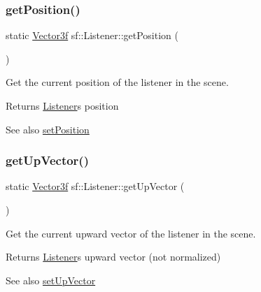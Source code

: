 \subsubsection{\texorpdfstring{getPosition()}{getPosition()}}
{\footnotesize\ttfamily static \mbox{\hyperlink{classsf_1_1_vector3}{Vector3f}} sf\+::\+Listener\+::get\+Position (\begin{DoxyParamCaption}{ }\end{DoxyParamCaption})\hspace{0.3cm}{\ttfamily [static]}}



Get the current position of the listener in the scene. 

\begin{DoxyReturn}{Returns}
\mbox{\hyperlink{classsf_1_1_listener}{Listener}}\textquotesingle{}s position
\end{DoxyReturn}
\begin{DoxySeeAlso}{See also}
\mbox{\hyperlink{classsf_1_1_listener_a5bc2d8d18ea2d8f339d23cbf17678564}{set\+Position}} \begin{DoxyVerb}\end{DoxyVerb}
 
\end{DoxySeeAlso}
\mbox{\label{classsf_1_1_listener_ae1427dd7e9b425b0c23b7b766bd6c6e6}} 
\subsubsection{\texorpdfstring{getUpVector()}{getUpVector()}}
{\footnotesize\ttfamily static \mbox{\hyperlink{classsf_1_1_vector3}{Vector3f}} sf\+::\+Listener\+::get\+Up\+Vector (\begin{DoxyParamCaption}{ }\end{DoxyParamCaption})\hspace{0.3cm}{\ttfamily [static]}}



Get the current upward vector of the listener in the scene. 

\begin{DoxyReturn}{Returns}
\mbox{\hyperlink{classsf_1_1_listener}{Listener}}\textquotesingle{}s upward vector (not normalized)
\end{DoxyReturn}
\begin{DoxySeeAlso}{See also}
\mbox{\hyperlink{classsf_1_1_listener_a0ea9b3083a994b2b90253543bc4e3ad6}{set\+Up\+Vector}} \begin{DoxyVerb}\end{DoxyVerb}
 
\end{DoxySeeAlso}
\mbox{\label{classsf_1_1_listener_ae479dc15513c6557984d26e32d06d06e}} 
